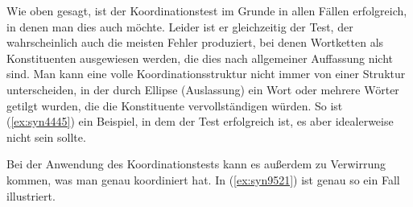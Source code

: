 \begin{exe}
  \ex\label{ex:syn4444}
  \begin{xlist}
    \begin{xlist}
    \end{xlist}
  \end{xlist}
\end{exe}

Wie oben gesagt, ist der Koordinationstest im Grunde in allen Fällen erfolgreich, in denen man dies auch möchte.
Leider ist er gleichzeitig der Test, der wahrscheinlich auch die meisten Fehler produziert, bei denen Wortketten als Konstituenten ausgewiesen werden, die dies nach allgemeiner Auffassung nicht sind.
Man kann eine volle Koordinationsstruktur nicht immer von einer Struktur unterscheiden, in der durch Ellipse (Auslassung) ein Wort oder mehrere Wörter getilgt wurden, die die Konstituente vervollständigen würden.
So ist \zB (\ref{ex:syn4445}) ein Beispiel, in dem der Test erfolgreich ist, es aber idealerweise nicht sein sollte.

\begin{sloppypar}
\begin{exe}
\end{exe}
\end{sloppypar}

Bei der Anwendung des Koordinationstests kann es außerdem zu Verwirrung kommen, was man genau koordiniert hat.
In (\ref{ex:syn9521}) ist genau so ein Fall illustriert.

